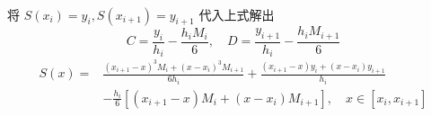 \documentclass[12pt,a4paper,UTF8]{ctexart}
\theoremstyle{nonumberplain}
\begin{document}
\begin{enumerate}
\begin{enumerate}
$$\begin{aligned}
                        \end{aligned}
                    $$
                    将 $S\left(x_{i}\right)=y_{i}, S\left(x_{i+1}\right)=y_{i+1}$ 代入上式解出
                    $$
                        C=\frac{y_{i}}{h_{i}}-\frac{h_{i} M_{i}}{6}, \quad D=\frac{y_{i+1}}{h_{i}}-\frac{h_{i} M_{i+1}}{6}
                    $$
                    \begin{equation}\label{eq1}
                        \begin{aligned}
                            S(x)= & \frac{\left(x_{i+1}-x\right)^{3} M_{i}+\left(x-x_{i}\right)^{3} M_{i+1}}{6 h_{i}}+\frac{\left(x_{i+1}-x\right) y_{i}+\left(x-x_{i}\right) y_{i+1}}{h_{i}} \\
                                  & -\frac{h_{i}}{6}\left[\left(x_{i+1}-x\right) M_{i}+\left(x-x_{i}\right) M_{i+1}\right], \quad x \in\left[x_{i}, x_{i+1}\right]
                        \end{aligned}\end{equation}


\end{enumerate}
\end{enumerate}
\end{document}
